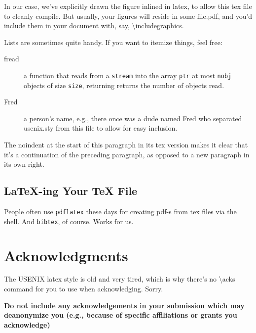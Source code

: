 In our case, we've explicitly drawn the figure inlined in latex, to
allow this tex file to cleanly compile. But usually, your figures will
reside in some file.pdf, and you'd include them in your document
with, say, \textbackslash{}includegraphics.

Lists are sometimes quite handy. If you want to itemize things, feel
free:

\begin{description}
  
\item[fread] a function that reads from a \texttt{stream} into the
  array \texttt{ptr} at most \texttt{nobj} objects of size
  \texttt{size}, returning returns the number of objects read.

\item[Fred] a person's name, e.g., there once was a dude named Fred
  who separated usenix.sty from this file to allow for easy
  inclusion.
\end{description}

\noindent
The noindent at the start of this paragraph in its tex version makes
it clear that it's a continuation of the preceding paragraph, as
opposed to a new paragraph in its own right.





\subsection{LaTeX-ing Your TeX File}

People often use \texttt{pdflatex} these days for creating pdf-s from
tex files via the shell. And \texttt{bibtex}, of course. Works for us.

\section*{Acknowledgments}

The USENIX latex style is old and very tired, which is why
there's no \textbackslash{}acks command for you to use when
acknowledging. Sorry.

\textbf{Do not include any acknowledgements in your submission which may deanonymize you (e.g., because of specific affiliations or grants you acknowledge)}

\cleardoublepage
\appendix
